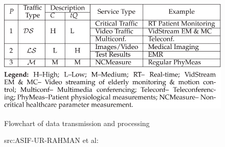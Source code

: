 \begin{figure}[H]
	\centering
	\includegraphics[width=\linewidth]{image/Table.png}
	\caption{Flowchart of data transmission and processing}
	\caption*{src:ASIF-UR-RAHMAN et al:\cite{3}}
\end{figure}
\newpage
